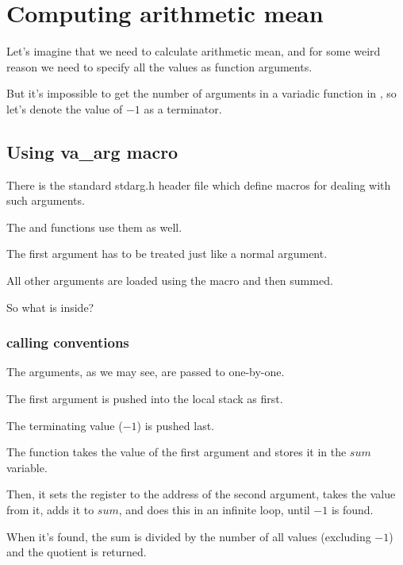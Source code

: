 \section{Computing arithmetic mean}

Let's imagine that we need to calculate \gls{arithmetic mean}, and for some weird reason 
we need to specify all the values as function arguments.

But it's impossible to get the number of arguments in a variadic function in \CCpp, so let's denote 
the value of $-1$ as a terminator.

\subsection{Using va\_arg macro}

There is the standard stdarg.h header file which define macros for dealing with such arguments.

The \printf and \scanf functions use them as well.



The first argument has to be treated just like a normal argument.

All other arguments are loaded using the  macro and then summed.

So what is inside?

\subsubsection{ calling conventions}



The arguments, as we may see, are passed to \main one-by-one.

The first argument is pushed into the local stack as first.

The terminating value ($-1$) is pushed last.

The  function takes the value of the first argument and stores it in the $sum$ variable.

Then, it sets the \EDX register to the address of the second argument, takes the value from it, adds it to $sum$,
and does this in an infinite loop, until $-1$ is found.

When it's found, the sum is divided by the number of all values (excluding $-1$) and the \gls{quotient} is returned.

